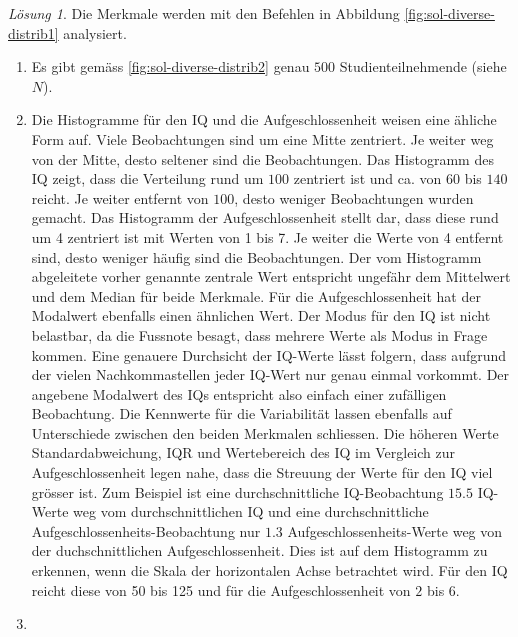 \documentclass[
]{book}
\providecommand{\tightlist}{%
  \setlength{\itemsep}{0pt}\setlength{\parskip}{0pt}}
\theoremstyle{definition}
\theoremstyle{definition}
\theoremstyle{definition}
\theoremstyle{definition}
\theoremstyle{remark}
\newtheorem*{solution}{Lösung}
\begin{document}
\begin{solution}
Die Merkmale werden mit den Befehlen in Abbildung \ref{fig:sol-diverse-distrib1} analysiert.

\begin{enumerate}
\def\labelenumi{\alph{enumi}.}
\tightlist
\item
  Es gibt gemäss \ref{fig:sol-diverse-distrib2} genau \(500\) Studienteilnehmende (siehe \(N\)).
\item
  Die Histogramme für den IQ und die Aufgeschlossenheit weisen eine ähliche Form auf. Viele Beobachtungen sind um eine Mitte zentriert. Je weiter weg von der Mitte, desto seltener sind die Beobachtungen. Das Histogramm des IQ zeigt, dass die Verteilung rund um \(100\) zentriert ist und ca. von \(60\) bis \(140\) reicht. Je weiter entfernt von \(100\), desto weniger Beobachtungen wurden gemacht. Das Histogramm der Aufgeschlossenheit stellt dar, dass diese rund um 4 zentriert ist mit Werten von 1 bis 7. Je weiter die Werte von 4 entfernt sind, desto weniger häufig sind die Beobachtungen. Der vom Histogramm abgeleitete vorher genannte zentrale Wert entspricht ungefähr dem Mittelwert und dem Median für beide Merkmale. Für die Aufgeschlossenheit hat der Modalwert ebenfalls einen ähnlichen Wert. Der Modus für den IQ ist nicht belastbar, da die Fussnote besagt, dass mehrere Werte als Modus in Frage kommen. Eine genauere Durchsicht der IQ-Werte lässt folgern, dass aufgrund der vielen Nachkommastellen jeder IQ-Wert nur genau einmal vorkommt. Der angebene Modalwert des IQs entspricht also einfach einer zufälligen Beobachtung. Die Kennwerte für die Variabilität lassen ebenfalls auf Unterschiede zwischen den beiden Merkmalen schliessen. Die höheren Werte Standardabweichung, IQR und Wertebereich des IQ im Vergleich zur Aufgeschlossenheit legen nahe, dass die Streuung der Werte für den IQ viel grösser ist. Zum Beispiel ist eine durchschnittliche IQ-Beobachtung \(15.5\) IQ-Werte weg vom durchschnittlichen IQ und eine durchschnittliche Aufgeschlossenheits-Beobachtung nur \(1.3\) Aufgeschlossenheits-Werte weg von der duchschnittlichen Aufgeschlossenheit. Dies ist auf dem Histogramm zu erkennen, wenn die Skala der horizontalen Achse betrachtet wird. Für den IQ reicht diese von 50 bis 125 und für die Aufgeschlossenheit von \(2\) bis \(6\).
\item

\end{enumerate}
\end{solution}
\end{document}
